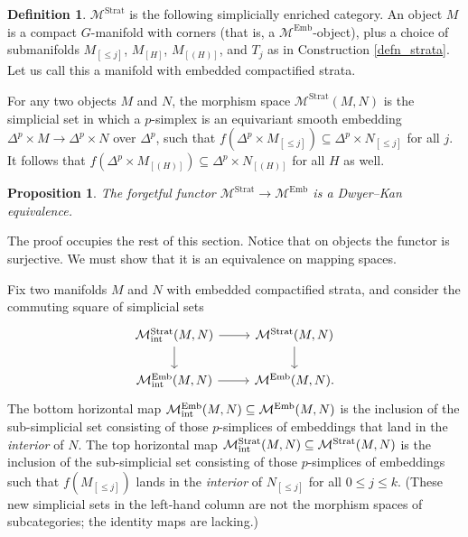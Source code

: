 \documentclass[11pt]{amsart}
\newtheorem{prop}{Proposition}[section]
\theoremstyle{definition}
\newtheorem{defn}{Definition}[section]
\numberwithin{equation}{section}
\numberwithin{figure}{section}
\newcommand{\mc}{\mathcal}
\newcommand{\Man}{\mc M^\mathrm{Emb}}
\newcommand{\Manstr}{\mc M^\mathrm{Strat}}
\begin{document}
\begin{defn}\label{m_strat}
	$\Manstr$ is the following simplicially enriched category. An object $M$ is a compact $G$-manifold with corners (that is, a $\Man$-object), plus a choice of submanifolds $M_{[\leq j]}$, $M_{[H]}$, $M_{[(H)]}$, and $T_j$ as in Construction \ref{defn_strata}. Let us call this a manifold with embedded compactified strata.
	
	
	For any two objects $M$ and $N$, the morphism space $\Manstr(M,N)$ is the simplicial set in which a $p$-simplex is an equivariant smooth embedding $\Delta^p \times M \to \Delta^p \times N$ over $\Delta^p$, such that $f(\Delta^p \times M_{[\leq j]}) \subseteq \Delta^p \times N_{[\leq j]}$ for all $j$. It follows that $f(\Delta^p \times M_{[(H)]}) \subseteq \Delta^p \times N_{[(H)]}$ for all $H$ as well.
 \end{defn}
 
 
\begin{prop}\label{manstr_equivalent}
	The forgetful functor $\Manstr \to \Man$ is a Dwyer--Kan equivalence.
\end{prop}

The proof occupies the rest of this section. Notice that on objects the functor is surjective. %
We must show that it is an equivalence on mapping spaces.

Fix two manifolds $M$ and $N$ with embedded compactified strata, and consider the commuting square of simplicial sets
	\begin{equation}\label{manstr_diagram}
	\begin{tikzcd}
		\Manstr_{\textup{int}}(M,N) \dar \rar & \Manstr(M,N) \dar \\
		\Man_{\textup{int}}(M,N) \rar & \Man(M,N).
	\end{tikzcd}
	\end{equation}
The bottom horizontal map $\Man_{\textup{int}}(M,N) \subseteq \Man(M,N)$ is the inclusion of the sub-simplicial set consisting of those $p$-simplices of embeddings that land in the \emph{interior} of $N$. The top horizontal map $\Manstr_{\textup{int}}(M,N) \subseteq \Manstr(M,N)$ is the inclusion of the sub-simplicial set consisting of those $p$-simplices of embeddings such that $f(M_{[\leq j]})$ lands in the \emph{interior} of $N_{[\leq j]}$ for all $0 \leq j \leq k$. (These new simplicial sets in the left-hand column are not the morphism spaces of subcategories; the identity maps are lacking.)
\end{document}
